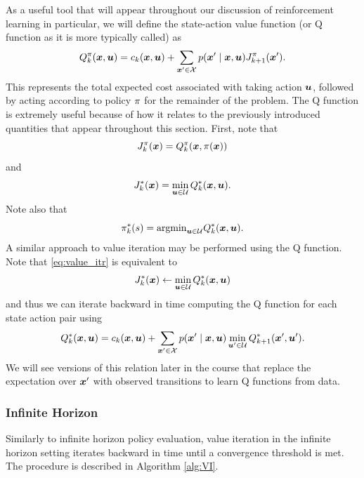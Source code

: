 As a useful tool that will appear throughout our discussion of reinforcement learning in particular, we will define the state-action value function (or Q function as it is more typically called) as 
\begin{equation}
    Q^{\pi}_k(\bm{x}, \bm{u}) = c_k(\bm{x}, \bm{u}) + \sum_{\bm{x}' \in \mathcal{X}} p(\bm{x}' \mid \bm{x}, \bm{u}) J^{\pi}_{k+1}(\bm{x}').
\end{equation}
This represents the total expected cost associated with taking action $\bm{u}$, followed by acting according to policy $\pi$ for the remainder of the problem. The Q function is extremely useful because of how it relates to the previously introduced quantities that appear throughout this section. First, note that 
\begin{equation}
    J^\pi_k(\bm{x}) = Q^{\pi}_k(\bm{x}, \pi(\bm{x}))
\end{equation}
and 
\begin{equation}
    J^*_k(\bm{x}) = \min_{\bm{u} \in \mathcal{U}} Q^{*}_k(\bm{x}, \bm{u}).
\end{equation}
Note also that 
\begin{equation}
    \pi^*_k(s) = \text{argmin}_{\bm{u} \in \mathcal{U}} Q^{*}_k(\bm{x}, \bm{u}).
\end{equation}
A similar approach to value iteration may be performed using the Q function. Note that \eqref{eq:value_itr} is equivalent to 
\begin{equation}
    J^*_k(\bm{x}) \gets \min_{\bm{u} \in \mathcal{U}} Q^*_k(\bm{x}, \bm{u})
\end{equation}
and thus we can iterate backward in time computing the Q function for each state action pair using 
\begin{equation}
    Q^{*}_k(\bm{x}, \bm{u}) = c_k(\bm{x}, \bm{u}) + \sum_{\bm{x}' \in \mathcal{X}} p(\bm{x}' \mid \bm{x}, \bm{u}) \min_{\bm{u}' \in \mathcal{U}}  Q^{*}_{k+1}(\bm{x}', \bm{u}').
\end{equation}
We will see versions of this relation later in the course that replace the expectation over $\bm{x}'$ with observed transitions to learn Q functions from data. 

\subsubsection{Infinite Horizon} 
Similarly to infinite horizon policy evaluation, value iteration in the infinite horizon setting iterates backward in time until a convergence threshold is met. The procedure is described in Algorithm \ref{alg:VI}.

